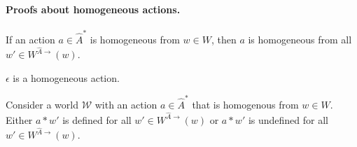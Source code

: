 \paragraph{Proofs about homogeneous actions.}

\begin{corollary}
    If an action $a \in \hat{A}^{*}$ is homogeneous from $w \in W$, then $a$ is homogeneous from all $w' \in W^{\hat{A}\to}(w)$.
\end{corollary}

\begin{corollaryE}
    $\epsilon$ is a homogeneous action.
\end{corollaryE}
\begin{proofE}
\end{proofE}

\begin{corollaryE}
\label{col:homogeneous_action_in_defined_or_undefined}
    Consider a world $\mathscr{W}$ with an action $a \in \hat{A}^{*}$ that is homogenous from $w \in W$.
    Either $a \ast w'$ is defined for all $w' \in W^{\hat{A}\to}(w)$ or $a \ast w'$ is undefined for all $w' \in W^{\hat{A}\to}(w)$.
\end{corollaryE}
\begin{proofE}
\end{proofE}


